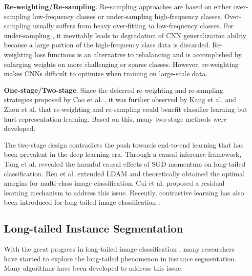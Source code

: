 \documentclass[final]{cvpr}
\begin{document}
\vspace{1mm}
\noindent\textbf{Re-weighting/Re-sampling}.
Re-sampling approaches are based on either over-sampling low-frequency classes or under-sampling high-frequency classes. Over-sampling \cite{shen2016relay, zhong2016towards, buda2018systematic, byrd2019effect} usually suffers from heavy over-fitting to low-frequency classes. For under-sampling \cite{he2009learning, japkowicz2002class, DBLP:journals/nn/BudaMM18}, it inevitably leads to degradation of CNN generalization ability because a large portion of the high-frequency class data is discarded.
Re-weighting \cite{DBLP:conf/cvpr/HuangLLT16,huang2019deep,wang2017learning, ren2018learning, shu2019meta, jamal2020rethinking} loss functions is an alternative to rebalancing and is accomplished by enlarging weights
on more challenging or sparse classes. However, re-weighting makes CNNs difficult to optimize when training on large-scale data.


\vspace{1mm}
\noindent\textbf{One-stage/Two-stage}.
Since the deferred re-weighting and re-sampling strategies proposed by Cao et al. \cite{cao2019learning}, it was further observed by Kang et al. \cite{kang2019decoupling} and Zhou et al. \cite{zhou2019bbn} that re-weighting and re-sampling could benefit classifier learning but hurt representation learning. Based on this, many two-stage methods \cite{cao2019learning, kang2019decoupling, Zhong_2021_CVPR} were developed. 


The two-stage design contradicts the push towards end-to-end learning that has been prevalent in the deep learning era. Through a causal inference framework, Tang et al. \cite{tang2020long} revealed the harmful causal effects of SGD momentum on long-tailed classification. Ren et al. \cite{DBLP:conf/nips/RenYSMZYL20} extended LDAM \cite{cao2019learning} and theoretically obtained the optimal margins for multi-class image classification. Cui et al. \cite{DBLP:conf/cvpr/CuiJLSB19} proposed a residual learning mechanism to address this issue. Recently, contrastive learning has also been introduced for long-tailed image classification \cite{cui2021parametric}.


\subsection{Long-tailed Instance Segmentation}
With the great progress in long-tailed image classification \cite{buda2018systematic,huang2016learning,DBLP:conf/cvpr/CuiJLSB19, he2009learning,chawla2002smote,DBLP:conf/nips/RenYSMZYL20,DBLP:conf/iclr/KangXRYGFK20, DBLP:journals/corr/abs-2010-01809, DBLP:journals/corr/abs-2101-10633, DBLP:conf/nips/TangHZ20, Zhong_2021_CVPR,cui2021parametric}, many researchers have started to explore the long-tailed phenomenon in instance segmentation. Many algorithms \cite{tan2020eql, li2020overcoming, wang2021seesaw} have been developed to address this issue.
\end{document}
